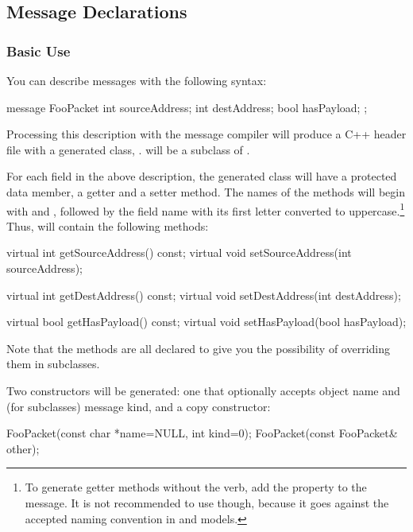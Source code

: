 \subsection{Message Declarations}

\subsubsection{Basic Use}

You can describe messages with the following syntax:

\begin{msg}
message FooPacket
{
    int sourceAddress;
    int destAddress;
    bool hasPayload;
};
\end{msg}

Processing this description with the message compiler will produce
a C++ header file with a generated class, .
 will be a subclass of .

For each field in the above description, the generated class will have
a protected data member, a getter and a setter method. The names of the
methods will begin with  and , followed by the field name
with its first letter converted to uppercase.\footnote{
  To generate getter methods without the  verb, add the
   property to the message. It is not recommended
  to use  though, because it goes against the
  accepted naming convention in {\opp} and models.}
Thus,  will contain the following methods:

\begin{cpp}
virtual int getSourceAddress() const;
virtual void setSourceAddress(int sourceAddress);

virtual int getDestAddress() const;
virtual void setDestAddress(int destAddress);

virtual bool getHasPayload() const;
virtual void setHasPayload(bool hasPayload);
\end{cpp}

Note that the methods are all declared  to give you the possibility
of overriding them in subclasses.

Two constructors will be generated: one that optionally accepts object name and
(for  subclasses) message kind, and a copy constructor:

\begin{cpp}
FooPacket(const char *name=NULL, int kind=0);
FooPacket(const FooPacket& other);
\end{cpp}

